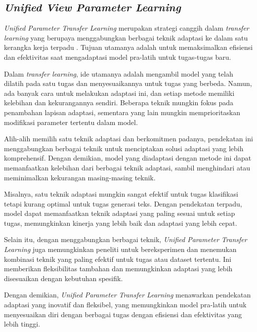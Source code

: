 \subsection{\textit{Unified View Parameter Learning}}

\textit{Unified Parameter Transfer Learning} merupakan strategi canggih dalam \textit{transfer learning} yang berupaya menggabungkan berbagai teknik adaptasi ke dalam satu kerangka kerja terpadu \parencite{uvpl}. Tujuan utamanya adalah untuk memaksimalkan efisiensi dan efektivitas saat mengadaptasi model pra-latih untuk tugas-tugas baru.

Dalam \textit{transfer learning}, ide utamanya adalah mengambil model yang telah dilatih pada satu tugas dan menyesuaikannya untuk tugas yang berbeda. Namun, ada banyak cara untuk melakukan adaptasi ini, dan setiap metode memiliki kelebihan dan kekurangannya sendiri. Beberapa teknik mungkin fokus pada penambahan lapisan adaptasi, sementara yang lain mungkin memprioritaskan modifikasi parameter tertentu dalam model.

Alih-alih memilih satu teknik adaptasi dan berkomitmen padanya, pendekatan ini menggabungkan berbagai teknik untuk menciptakan solusi adaptasi yang lebih komprehensif. Dengan demikian, model yang diadaptasi dengan metode ini dapat memanfaatkan kelebihan dari berbagai teknik adaptasi, sambil menghindari atau meminimalkan kekurangan masing-masing teknik.

Misalnya, satu teknik adaptasi mungkin sangat efektif untuk tugas klasifikasi tetapi kurang optimal untuk tugas generasi teks. Dengan pendekatan terpadu, model dapat memanfaatkan teknik adaptasi yang paling sesuai untuk setiap tugas, memungkinkan kinerja yang lebih baik dan adaptasi yang lebih cepat.

Selain itu, dengan menggabungkan berbagai teknik, \textit{Unified Parameter Transfer Learning} juga memungkinkan peneliti untuk bereksperimen dan menemukan kombinasi teknik yang paling efektif untuk tugas atau dataset tertentu. Ini memberikan fleksibilitas tambahan dan memungkinkan adaptasi yang lebih disesuaikan dengan kebutuhan spesifik.

Dengan demikian, \textit{Unified Parameter Transfer Learning} menawarkan pendekatan adaptasi yang inovatif dan fleksibel, yang memungkinkan model pra-latih untuk menyesuaikan diri dengan berbagai tugas dengan efisiensi dan efektivitas yang lebih tinggi.